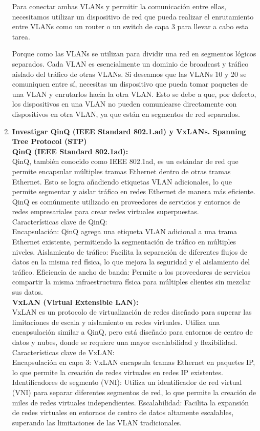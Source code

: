 \documentclass[a4paper]{article}
\begin{document}
\begin{enumerate}
Para conectar ambas VLANs y permitir la comunicación entre ellas, necesitamos utilizar un dispositivo de red que pueda realizar el enrutamiento entre VLANs como un router o un switch de capa 3 para llevar a cabo esta tarea.

Porque como las VLANs se utilizan para dividir una red en segmentos lógicos separados. Cada VLAN es esencialmente un dominio de broadcast y tráfico aislado del tráfico de otras VLANs. Si deseamos que las VLANs 10 y 20 se comuniquen entre sí, necesitas un dispositivo que pueda tomar paquetes de una VLAN y enrutarlos hacia la otra VLAN. Esto se debe a que, por defecto, los dispositivos en una VLAN no pueden comunicarse directamente con dispositivos en otra VLAN, ya que están en segmentos de red separados.

\item  \textbf{Investigar QinQ (IEEE Standard 802.1.ad) y VxLANs.
	Spanning Tree Protocol (STP)}
\\
\textbf{QinQ (IEEE Standard 802.1ad):}
\\
QinQ, también conocido como IEEE 802.1ad, es un estándar de red que permite encapsular múltiples tramas Ethernet dentro de otras tramas Ethernet. Esto se logra añadiendo etiquetas VLAN adicionales, lo que permite segmentar y aislar tráfico en redes Ethernet de manera más eficiente. QinQ es comúnmente utilizado en proveedores de servicios y entornos de redes empresariales para crear redes virtuales superpuestas.
\\
Características clave de QinQ:
\\
Encapsulación: QinQ agrega una etiqueta VLAN adicional a una trama Ethernet existente, permitiendo la segmentación de tráfico en múltiples niveles.
Aislamiento de tráfico: Facilita la separación de diferentes flujos de datos en la misma red física, lo que mejora la seguridad y el aislamiento del tráfico.
Eficiencia de ancho de banda: Permite a los proveedores de servicios compartir la misma infraestructura física para múltiples clientes sin mezclar sus datos.
\\
\textbf{VxLAN (Virtual Extensible LAN):}
\\
VxLAN es un protocolo de virtualización de redes diseñado para superar las limitaciones de escala y aislamiento en redes virtuales. Utiliza una encapsulación similar a QinQ, pero está diseñado para entornos de centro de datos y nubes, donde se requiere una mayor escalabilidad y flexibilidad.
\\
Características clave de VxLAN:
\\
Encapsulación en capa 3: VxLAN encapsula tramas Ethernet en paquetes IP, lo que permite la creación de redes virtuales en redes IP existentes.
Identificadores de segmento (VNI): Utiliza un identificador de red virtual (VNI) para separar diferentes segmentos de red, lo que permite la creación de miles de redes virtuales independientes.
Escalabilidad: Facilita la expansión de redes virtuales en entornos de centro de datos altamente escalables, superando las limitaciones de las VLAN tradicionales.


\end{enumerate}
\end{document}
